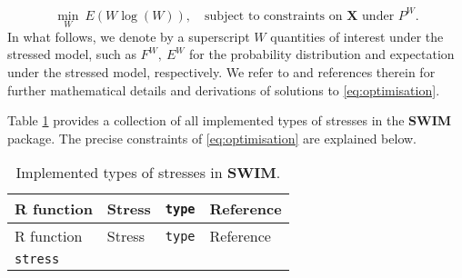 \documentclass[
]{article}
\begin{document}
\begin{equation} 
\min_{ W } ~E(W \log (W)), \quad
\text{subject to constraints on } \mathbf X \text{ under } P^W.
\label{eq:optimisation}
\end{equation}
In what follows, we denote by a superscript \(W\) quantities of interest under the stressed model, such as \(F^W, ~ E^W\) for the probability distribution and expectation under the stressed model, respectively. We refer to \citet{Pesenti2019} and references therein for further mathematical details and derivations of solutions to \eqref{eq:optimisation}.

Table \ref{tab:Rfunstress} provides a collection of all implemented types of stresses in the \textbf{SWIM} package. The precise constraints of \eqref{eq:optimisation} are explained below.

\begin{longtable}[]{@{}llll@{}}
\caption{\label{tab:Rfunstress} Implemented types of stresses in \textbf{SWIM}.}\tabularnewline
\toprule
\begin{minipage}[b]{0.20\columnwidth}\raggedright
R function\strut
\end{minipage} & \begin{minipage}[b]{0.39\columnwidth}\raggedright
Stress\strut
\end{minipage} & \begin{minipage}[b]{0.09\columnwidth}\raggedright
\texttt{type}\strut
\end{minipage} & \begin{minipage}[b]{0.20\columnwidth}\raggedright
Reference\strut
\end{minipage}\tabularnewline
\midrule
\endfirsthead
\toprule
\begin{minipage}[b]{0.20\columnwidth}\raggedright
R function\strut
\end{minipage} & \begin{minipage}[b]{0.39\columnwidth}\raggedright
Stress\strut
\end{minipage} & \begin{minipage}[b]{0.09\columnwidth}\raggedright
\texttt{type}\strut
\end{minipage} & \begin{minipage}[b]{0.20\columnwidth}\raggedright
Reference\strut
\end{minipage}\tabularnewline
\midrule
\endhead
\begin{minipage}[t]{0.20\columnwidth}\raggedright
\texttt{stress}\strut
\end{minipage} & \begin{minipage}[t]{0.39\columnwidth}\raggedright

\end{minipage}
\end{longtable}
\end{document}
